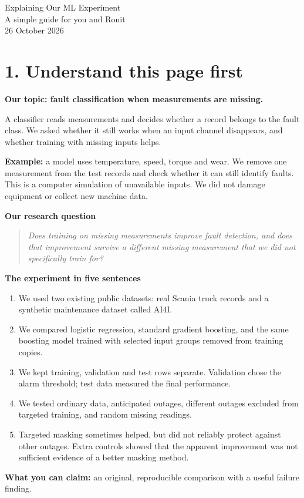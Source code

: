\documentclass[11pt,a4paper]{article}
\newcommand{\say}[1]{\begin{quote}\itshape #1\end{quote}}
\begin{document}
\begin{center}
{\LARGE Explaining Our ML Experiment}\\[5pt]
{\large A simple guide for you and Ronit}\\[4pt]
26 October 2026
\end{center}
\section*{1. Understand this page first}
\textbf{Our topic: fault classification when measurements are missing.}

A classifier reads measurements and decides whether a record belongs to the fault class. We asked whether it still works when an input channel disappears, and whether training with missing inputs helps.

\textbf{Example:} a model uses temperature, speed, torque and wear. We remove one measurement from the test records and check whether it can still identify faults. This is a computer simulation of unavailable inputs. We did not damage equipment or collect new machine data.

\textbf{Our research question}
\say{Does training on missing measurements improve fault detection, and does that improvement survive a different missing measurement that we did not specifically train for?}

\textbf{The experiment in five sentences}
\begin{enumerate}
\item We used two existing public datasets: real Scania truck records and a synthetic maintenance dataset called AI4I.
\item We compared logistic regression, standard gradient boosting, and the same boosting model trained with selected input groups removed from training copies.
\item We kept training, validation and test rows separate. Validation chose the alarm threshold; test data measured the final performance.
\item We tested ordinary data, anticipated outages, different outages excluded from targeted training, and random missing readings.
\item Targeted masking sometimes helped, but did not reliably protect against other outages. Extra controls showed that the apparent improvement was not sufficient evidence of a better masking method.
\end{enumerate}

\textbf{What you can claim:} an original, reproducible comparison with a useful failure finding.
\end{document}
